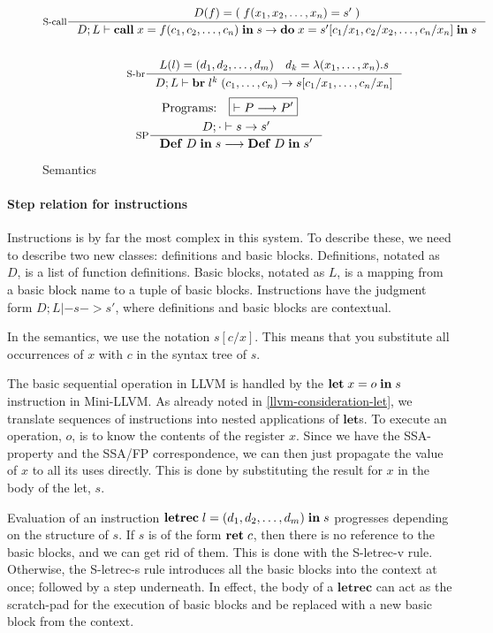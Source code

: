 \documentclass[a4paper, oneside, 10pt, draft]{memoir}
\begin{document}
\begin{figure}
\begin{gather*}
    \inference[S-call]{D(f) = (\;f(x_1, x_2, \dotsc, x_n) = s'\;)}{D;L |-
      \icall{x}{f}{(c_1, c_2, \dotsc, c_n)}{s} -> \ido{x}{s'[c_1/x_1, c_2/x_2,
        \dotsc, c_n/x_n]}{s}}\\\\
    \inference[S-br]{L(l) = \dbundle \quad d_k = \lambda(x_1, \dotsc,
      x_n).s}{D;L |- \ibr{l^k}{(c_1, \dotsc, c_n)} -> s[c_1/x_1, \dotsc, c_n/x_n]}
 \end{gather*}
 \begin{gather*}
   \text{Programs:} \quad \boxed{|- P --> P'}\\
   \inference[SP]{D;\cdot |- s -> s'}{\ipgm{D}{s} --> \ipgm{D}{s'}}
 \end{gather*}
  \caption{Semantics}
  \label{fig:semantics}
\end{figure}

\paragraph{Step relation for instructions}

Instructions is by far the most complex in this system. To describe
these, we need to describe two new classes: definitions and basic
blocks. Definitions, notated as $D$, is a list of function
definitions. Basic blocks, notated as $L$, is a mapping from a basic
block name to a tuple of basic blocks. Instructions have the
judgment form $\boxed{D;L |- s -> s'}$, where definitions and basic
blocks are contextual.

In the semantics, we use the notation $s[c/x]$. This means that you
substitute all occurrences of $x$ with $c$ in the syntax tree of
$s$.

The basic sequential operation in LLVM is handled by the
$\mathbf{let} \; x = o \; \mathbf{in} \; s$ instruction in Mini-LLVM. As already noted in
\ref{llvm-consideration-let}, we translate sequences of instructions
into nested applications of $\mathbf{let}$s. To execute an operation,
$o$, is to know the contents of the register $x$. Since we have the
SSA-property and the SSA/FP correspondence, we can then just propagate
the value of $x$ to all its uses directly. This is done by
substituting the result for $x$ in the body of the let, $s$.

Evaluation of an instruction $\mathbf{letrec} \; l = (d_1, d_2, \dotsc, d_m) \; \mathbf{in} \; s$ progresses
depending on the structure of $s$. If $s$ is of the form $\mathbf{ret} \; c$,
then there is no reference to the basic blocks, and we can get rid of
them. This is done with the S-letrec-v rule. Otherwise, the S-letrec-s
rule introduces all the basic blocks into the context at once;
followed by a step underneath.  In effect, the body of a
$\mathbf{letrec}$ can act as the scratch-pad for the execution of
basic blocks and be replaced with a new basic block from the context.
\end{document}
